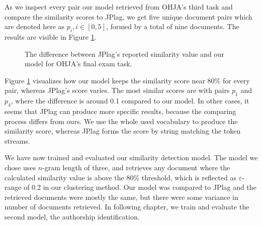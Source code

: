 As we inspect every pair our model retrieved from OHJA's third task and compare the similarity scores to JPlag, we get five unique document pairs which are denoted here as $p_i, i \in [0, 5]$, formed by a total of nine documents. The results are visible in Figure \ref{fig-jplag-sd-ohja3}.

\begin{figure}[ht]
    \centering
    \setlength\figureheight{5cm}
    \setlength{}
    
    \caption{The difference between JPlag's reported similarity value and our model for OHJA's final exam task.}
    \label{fig-jplag-sd-ohja3}
\end{figure}

\noindent
Figure \ref{fig-jplag-sd-ohja3} visualizes how our model keeps the similarity score near 80\% for every pair, whereas JPlag's score varies. The most similar scores are with pairs $p_1$ and $p_4$, where the difference is around 0.1 compared to our model. In other cases, it seems that JPlag can produce more specific results, because the comparing process differs from ours. We use the whole used vocabulary to produce the similarity score, whereas JPlag forms the score by string matching the token streams. 

We have now trained and evaluated our similarity detection model. The model we chose uses $n$-gram length of three, and retrieves any document where the calculated similarity value is above the 80\% threshold, which is reflected as $\varepsilon$-range of 0.2 in our clustering method. Our model was compared to JPlag and the retrieved documents were mostly the same, but there were some variance in number of documents retrieved. In following chapter, we train and evaluate the second model, the authorship identification.




